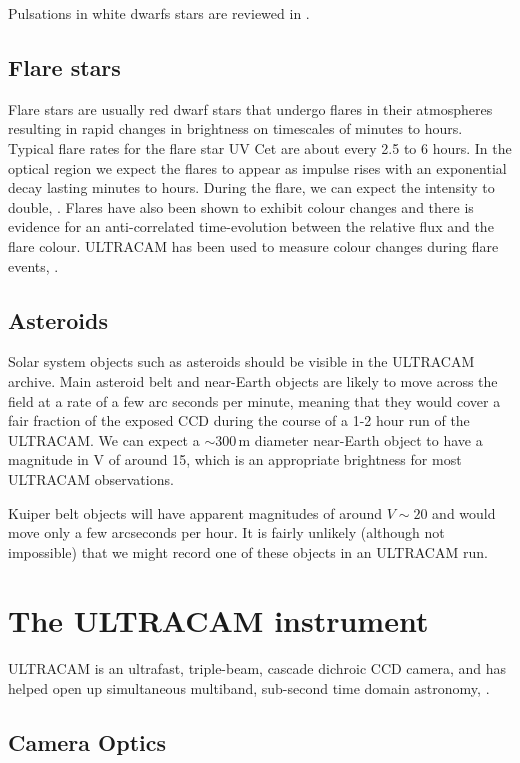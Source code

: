 Pulsations in white dwarfs stars are reviewed in \citet{wingetreview}.

\subsection{Flare stars}
Flare stars are usually red dwarf stars that undergo flares in their atmospheres resulting in rapid changes in brightness on timescales of minutes to hours. Typical flare rates for the flare star {UV Cet} are about every 2.5 to 6 hours. In the optical region we expect the flares to appear as impulse rises with an exponential decay lasting minutes to hours. During the flare, we can expect the intensity to double, \citep{stellaractivity}. Flares have also been shown to exhibit colour changes and there is evidence for an anti-correlated time-evolution between the relative flux and the flare colour. ULTRACAM has been used to measure colour changes during flare events, \citep{ULTRACAMFlare}.

\subsection{Asteroids}
Solar system objects such as asteroids should be visible in the ULTRACAM archive. Main asteroid belt and near-Earth objects are likely to move across the field at a rate of a few arc seconds per minute, meaning that they would cover a fair fraction of the exposed CCD during the course of a 1-2 hour run of the ULTRACAM. We can expect a $\sim 300\,\mbox{m}$ diameter near-Earth object to have a magnitude in V of around 15, \citep{neosmalltelescope} which is an appropriate brightness for most ULTRACAM observations. 

Kuiper belt objects will have apparent magnitudes of around $V\sim 20$ and would move only a few arcseconds per hour. It is fairly unlikely (although not impossible) that we might record one of these objects in an ULTRACAM run. 

\section{The ULTRACAM instrument} 
ULTRACAM is an ultrafast, triple-beam, cascade dichroic CCD camera, and has helped open up simultaneous multiband, sub-second time domain astronomy, \citep{dhillon07}. 

\subsection{Camera Optics}

